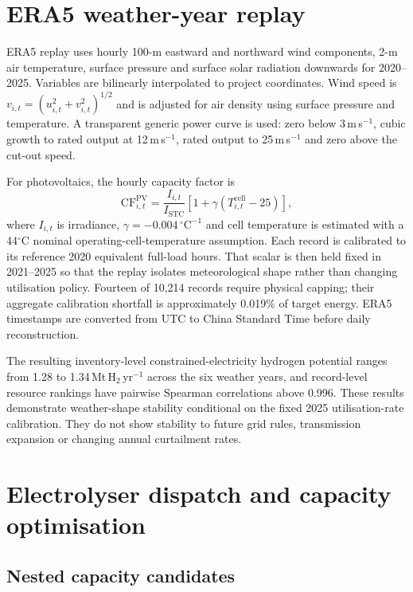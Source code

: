 \documentclass[pdflatex,sn-nature]{sn-jnl}
\begin{document}
\section{ERA5 weather-year replay}\label{sec:era5}

ERA5 replay uses hourly 100-m eastward and northward wind components, 2-m air temperature, surface pressure and surface solar radiation downwards for 2020--2025\cite{hersbach2020,era5data}. Variables are bilinearly interpolated to project coordinates. Wind speed is $v_{i,t}=(u_{i,t}^2+v_{i,t}^2)^{1/2}$ and is adjusted for air density using surface pressure and temperature. A transparent generic power curve is used: zero below 3\,m\,s$^{-1}$, cubic growth to rated output at 12\,m\,s$^{-1}$, rated output to 25\,m\,s$^{-1}$ and zero above the cut-out speed.

For photovoltaics, the hourly capacity factor is
\begin{equation}
\mathrm{CF}^{\mathrm{PV}}_{i,t}=\frac{I_{i,t}}{I_{\mathrm{STC}}}
\left[1+\gamma\left(T^{\mathrm{cell}}_{i,t}-25\right)\right],
\label{eq:pv}
\end{equation}
where $I_{i,t}$ is irradiance, $\gamma=-0.004\,^{\circ}\mathrm{C}^{-1}$ and cell temperature is estimated with a 44$^{\circ}$C nominal operating-cell-temperature assumption. Each record is calibrated to its reference 2020 equivalent full-load hours. That scalar is then held fixed in 2021--2025 so that the replay isolates meteorological shape rather than changing utilisation policy. Fourteen of 10,214 records require physical capping; their aggregate calibration shortfall is approximately 0.019\% of target energy. ERA5 timestamps are converted from UTC to China Standard Time before daily reconstruction.

The resulting inventory-level constrained-electricity hydrogen potential ranges from 1.28 to 1.34\,Mt\,H$_2$\,yr$^{-1}$ across the six weather years, and record-level resource rankings have pairwise Spearman correlations above 0.996. These results demonstrate weather-shape stability conditional on the fixed 2025 utilisation-rate calibration. They do not show stability to future grid rules, transmission expansion or changing annual curtailment rates.

\section{Electrolyser dispatch and capacity optimisation}\label{sec:capacity}

\subsection{Nested capacity candidates}
\end{document}
